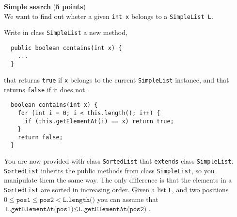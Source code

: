 \documentclass[]{exercices}
\begin{document}
\begin{question} \textbf{Simple search} (\textbf{5 points}) \\
We want to find out wheter a given \verb!int x! belongs to
a \verb!SimpleList L!.

Write in class \verb!SimpleList! a new method,
\begin{verbatim}
  public boolean contains(int x) {
    ...
  }
\end{verbatim}
that returns \verb!true! if \verb!x! belongs to the current \verb!SimpleList!
instance, and that returns \verb!false! if it does not.

\begin{correction}
\begin{verbatim}
  boolean contains(int x) {
    for (int i = 0; i < this.length(); i++) {
      if (this.getElementAt(i) == x) return true;
    }
    return false;
  }
\end{verbatim}
\end{correction}
\end{question}

You are now provided with class \verb!SortedList! that
\verb!extends! class \verb!SimpleList!.
\verb!SortedList! inherits the public methods from class \verb!SimpleList!,
so you manipulate them the same way.
The only difference is that the elements in a \verb!SortedList! are sorted in
increasing order. Given a list \verb!L!, and two positions $ 0 \leq \texttt{pos1} \leq
\texttt{pos2} < \texttt{L.length()}$ you can assume that
$\texttt{L.getElementAt(pos1)} \leq \texttt{L.getElementAt(pos2)}$.
\end{document}
